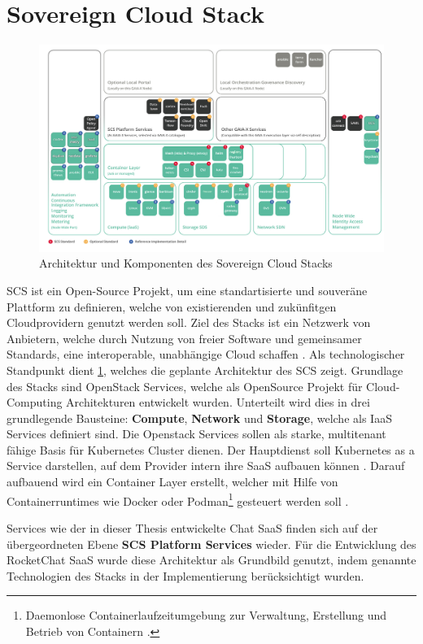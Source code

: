 \section{Sovereign Cloud Stack}
\label{sec:gaia-x-einbettung:scs}

\begin{figure}[h]
  \centering
  \includegraphics[height=0.71\textwidth]{gfx/chapters/4_gaia-X/scs_architecture.png}
  \caption{Architektur und Komponenten des Sovereign Cloud Stacks}
  \label{fig:scs_architecture}
\end{figure}

\ac{SCS} ist ein Open-Source Projekt, um eine standartisierte und souveräne Plattform zu definieren, welche von 
existierenden und zukünfitgen Cloudprovidern genutzt werden soll. 
Ziel des Stacks ist ein Netzwerk von Anbietern, welche durch Nutzung von freier Software und gemeinsamer Standards,
eine interoperable, unabhängige Cloud schaffen \cite{Kagermann2021}.
Als technologischer Standpunkt dient \ref{fig:scs_architecture}, welches die geplante Architektur des \ac{SCS} zeigt. 
Grundlage des Stacks sind OpenStack Services, welche als OpenSource Projekt für Cloud-Computing Architekturen entwickelt wurden.
Unterteilt wird dies in drei grundlegende Bausteine: \textbf{Compute}, \textbf{Network} und \textbf{Storage},
welche als \ac{IaaS} Services definiert sind.
Die Openstack Services sollen als starke, multitenant fähige Basis für Kubernetes Cluster dienen. 
Der Hauptdienst soll Kubernetes as a Service darstellen, auf dem Provider intern ihre \ac{SaaS} aufbauen können \cite{scs}.
Darauf aufbauend wird ein Container Layer erstellt, welcher mit Hilfe von Containerruntimes
wie Docker oder 
Podman\footnote{Daemonlose Containerlaufzeitumgebung zur Verwaltung, Erstellung und Betrieb von Containern \cite{podman}.}
gesteuert werden soll \cite{scs}.

Services wie der in dieser Thesis entwickelte Chat \ac{SaaS} finden sich auf der übergeordneten Ebene \textbf{SCS Platform Services} wieder.
Für die Entwicklung des RocketChat \ac{SaaS} wurde diese Architektur als Grundbild genutzt, indem 
genannte Technologien des Stacks in der Implementierung berücksichtigt wurden.